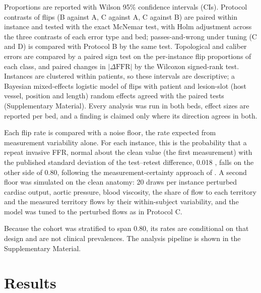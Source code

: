 \documentclass[journal,twoside,web]{ieeecolor}
\begin{document}
Proportions are reported with Wilson 95\% confidence intervals (CIs). Protocol contrasts of flips (B against A, C
against A, C against B) are paired within instance and tested with the exact McNemar test, with Holm adjustment
across the three contrasts of each error type and bed; passes-and-wrong under tuning (C and D) is compared with
Protocol B by the same test. Topological and caliber errors are compared by a paired sign test on
the per-instance flip proportions of each class, and paired changes in $|\Delta\mathrm{FFR}|$ by the Wilcoxon
signed-rank test. Instances are clustered within patients, so these intervals are descriptive; a Bayesian mixed-effects logistic model of flips with patient and lesion-slot (host vessel, position and length) random effects agreed with the paired tests (Supplementary Material). Every analysis was run in both beds, effect sizes are reported per bed, and a finding is
claimed only where its direction agrees in both.

Each flip rate is compared with a noise floor, the rate expected from measurement variability alone. For each instance, this is the probability that a repeat invasive FFR, normal about the clean value (the first measurement) with the published standard deviation of the test--retest difference, 0.018 \cite{johnson2015}, falls on the other side of 0.80, following the measurement-certainty approach of \cite{petraco2013}. A second floor was simulated on the clean anatomy: 20 draws
per instance perturbed cardiac output, aortic pressure, blood viscosity, the share of flow to each territory and the
measured territory flows by their within-subject variability, and the model was tuned to the perturbed flows as in
Protocol C.

Because the cohort was stratified to span 0.80, its rates are conditional
on that design and are not clinical prevalences. The analysis pipeline is shown in the Supplementary Material.

\section{Results}
\end{document}
